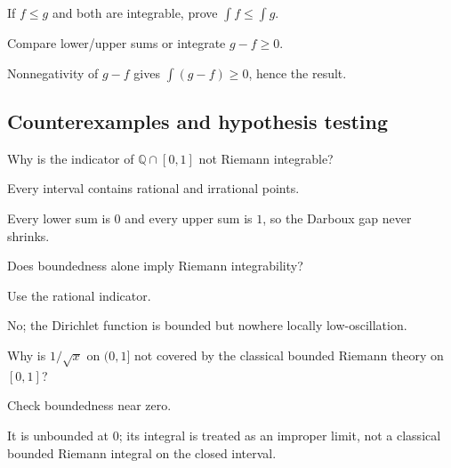 \begin{exercise}\label{exr:ii10-expand-09}
If \(f\le g\) and both are integrable, prove \(\int f\le\int g\).
\end{exercise}
\begin{hint}
Compare lower/upper sums or integrate \(g-f\ge0\).
\end{hint}
\begin{solution}
Nonnegativity of \(g-f\) gives \(\int(g-f)\ge0\), hence the result.
\end{solution}

\subsection*{Counterexamples and hypothesis testing}

\begin{exercise}\label{exr:ii10-expand-10}
Why is the indicator of \(\mathbb Q\cap[0,1]\) not Riemann integrable?
\end{exercise}
\begin{hint}
Every interval contains rational and irrational points.
\end{hint}
\begin{solution}
Every lower sum is \(0\) and every upper sum is \(1\), so the Darboux gap never shrinks.
\end{solution}

\begin{exercise}\label{exr:ii10-expand-11}
Does boundedness alone imply Riemann integrability?
\end{exercise}
\begin{hint}
Use the rational indicator.
\end{hint}
\begin{solution}
No; the Dirichlet function is bounded but nowhere locally low-oscillation.
\end{solution}

\begin{exercise}\label{exr:ii10-expand-12}
Why is \(1/\sqrt{x}\) on \((0,1]\) not covered by the classical bounded Riemann theory on \([0,1]\)?
\end{exercise}
\begin{hint}
Check boundedness near zero.
\end{hint}
\begin{solution}
It is unbounded at \(0\); its integral is treated as an improper limit, not a classical bounded Riemann integral on the closed interval.
\end{solution}

